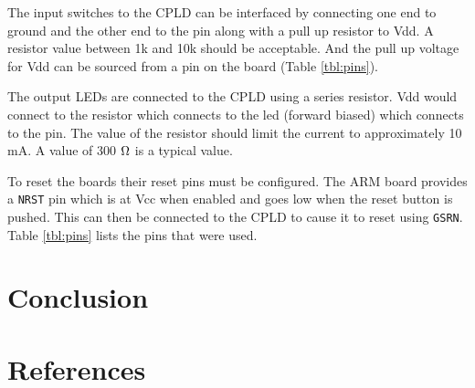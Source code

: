 \documentclass{article}
\begin{document}
The input switches to the CPLD can be interfaced by connecting
one end to ground and the other end to the pin along with a
pull up resistor to Vdd.
A resistor value between 1k and 10k should be acceptable.
And the pull up voltage for Vdd can be sourced from a pin on
the board (Table \ref{tbl:pins}).

The output LEDs are connected to the CPLD using a series
resistor.
Vdd would connect to the resistor which connects to the led
(forward biased) which connects to the pin.
The value of the resistor should limit the current to approximately
10 mA.
A value of 300 $\ohm$ is a typical value.

To reset the boards their reset pins must be configured.
The ARM board provides a \verb+NRST+ pin which is at Vcc
when enabled and goes low when the reset button is pushed\cite[Pg. 17, 20]{UM1079}.
This can then be connected to the CPLD to cause
it to reset using \verb+GSRN+\citetext{\citealp[Pg. 13, 46, 50, 53]{DS1002}; \citealp[Pg. 8]{EB66}}.
Table \ref{tbl:pins} lists the pins that were used.

\clearpage


\section{Conclusion}


\clearpage

\pagebreak
\renewcommand*{\refname}{\vspace{-8mm}}
\section{References}
%


\end{document}
